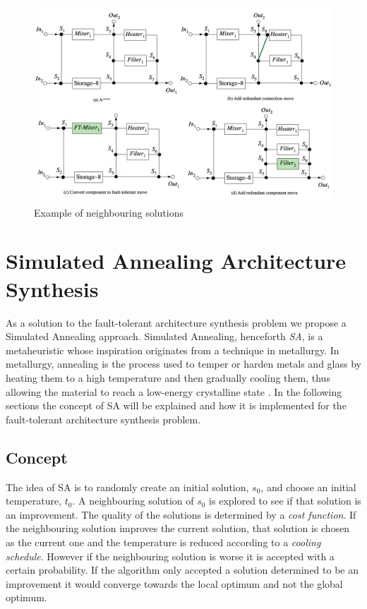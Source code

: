 \begin{figure}[H]
\centering
\includegraphics[scale=0.35]{figures/moves.png}
\caption[Example of neighbouring solutions]{Example of neighbouring solutions}
\label{fig:moves}
\end{figure}



\section{Simulated Annealing Architecture Synthesis}
\label{sec:sa}
As a solution to the fault-tolerant architecture synthesis problem we propose a Simulated Annealing approach. Simulated Annealing, henceforth \emph{SA}, is a metaheuristic whose inspiration originates from a technique in metallurgy. In metallurgy, annealing is the process used to temper or harden metals and glass by heating them to a high temperature and then gradually cooling them, thus allowing the material to reach a low-energy crystalline state \cite{arti-intel}. In the following sections the concept of SA will be explained and how it is implemented for the fault-tolerant architecture synthesis problem.

\subsection{Concept}
The idea of SA is to randomly create an initial solution, $s_0$, and choose an initial temperature, $t_0$. A neighbouring solution of $s_0$ is explored to see if that solution is an improvement. The quality of the solutions is determined by a \emph{cost function}. If the neighbouring solution improves the current solution, that solution is chosen as the current one and the temperature is reduced according to a \emph{cooling schedule}. However if the neighbouring solution is worse it is accepted with a certain probability. If the algorithm only accepted a solution determined to be an improvement it would converge towards the local optimum and not the global optimum.


